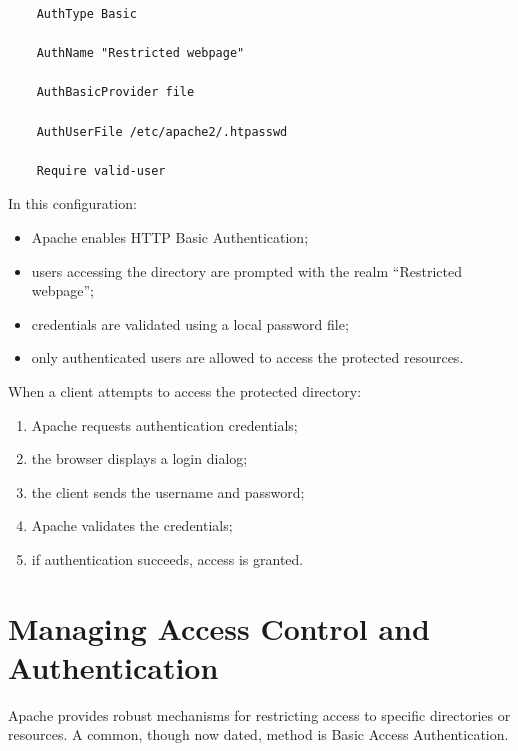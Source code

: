 \documentclass{scrbook}
\begin{document}
	\begin{lstlisting}
	AuthType Basic
		
	AuthName "Restricted webpage"
		
	AuthBasicProvider file
		
	AuthUserFile /etc/apache2/.htpasswd
		
	Require valid-user
	\end{lstlisting}
	
	In this configuration:
	\begin{itemize}
		\item Apache enables HTTP Basic Authentication;
		
		\item users accessing the directory are prompted with the realm ``Restricted webpage'';
		
		\item credentials are validated using a local password file;
		
		\item only authenticated users are allowed to access the protected resources.
	\end{itemize}
	
	When a client attempts to access the protected directory:
	\begin{enumerate}
		\item Apache requests authentication credentials;
		
		\item the browser displays a login dialog;
		
		\item the client sends the username and password;
		
		\item Apache validates the credentials;
		
		\item if authentication succeeds, access is granted.
	\end{enumerate}
	
	\section{Managing Access Control and Authentication}
	
	Apache provides robust mechanisms for restricting access to specific directories or resources. A common, though now dated, method is Basic Access Authentication.
	
\end{document}
